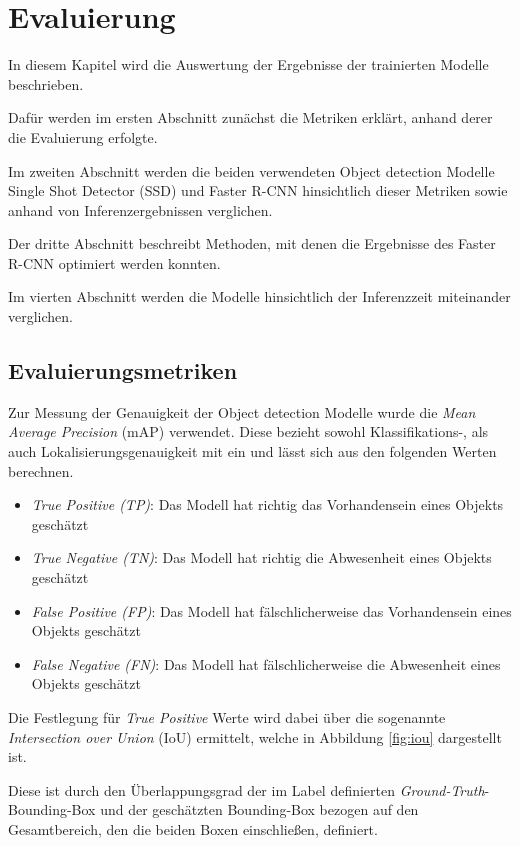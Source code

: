 \chapter{Evaluierung}\label{kap:eval}

In diesem Kapitel wird die Auswertung der 
Ergebnisse der trainierten Modelle beschrieben.

Dafür werden im ersten Abschnitt zunächst die Metriken 
erklärt, anhand derer die Evaluierung erfolgte. 

Im zweiten Abschnitt werden die beiden verwendeten Object 
detection Modelle Single Shot Detector (SSD)
und Faster R-CNN hinsichtlich dieser Metriken
sowie anhand von
Inferenzergebnissen verglichen.

Der dritte Abschnitt beschreibt Methoden, mit denen 
die Ergebnisse des Faster R-CNN optimiert werden konnten.

Im vierten Abschnitt werden die Modelle hinsichtlich 
der Inferenzzeit miteinander verglichen.


\section{Evaluierungsmetriken}\label{sec:metricen}

Zur Messung der Genauigkeit der Object detection Modelle 
wurde die \textit{Mean Average Precision} (mAP) verwendet.
Diese bezieht sowohl Klassifikations-, als auch
Lokalisierungsgenauigkeit mit ein und
lässt sich aus den folgenden Werten berechnen.

\begin{itemize}
  \item \textit{True Positive (TP)}:
  Das Modell hat richtig das Vorhandensein eines Objekts geschätzt
  \item \textit{True Negative (TN)}:
  Das Modell hat richtig die Abwesenheit eines Objekts geschätzt
  \item \textit{False Positive (FP)}:
  Das Modell hat fälschlicherweise das Vorhandensein eines Objekts
  geschätzt
  \item \textit{False Negative (FN)}:
  Das Modell hat fälschlicherweise die Abwesenheit eines Objekts
  geschätzt
\end{itemize}

Die Festlegung für \textit{True Positive} Werte wird dabei über die
sogenannte \textit{Intersection over Union} (IoU) ermittelt,
welche in Abbildung \ref{fig:iou} dargestellt ist.


Diese ist durch den Überlappungsgrad der im Label definierten
\textit{Ground-Truth}-Bounding-Box und der geschätzten Bounding-Box
bezogen auf den Gesamtbereich, den die beiden Boxen einschließen,
definiert.

